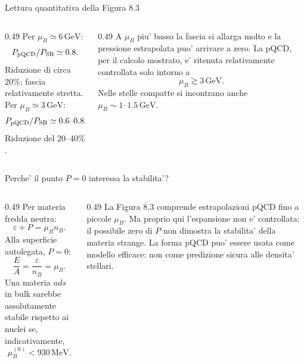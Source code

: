 \begin{frame}{Lettura quantitativa della Figura 8.3}
\small
\begin{columns}[T,onlytextwidth]
\begin{column}{0.49\textwidth}
Per $\mu_B\simeq6\,\mathrm{GeV}$:
\[
P_{\rm pQCD}/P_{\rm SB}\simeq0.8.
\]
Riduzione di circa $20\%$; fascia relativamente stretta.
\medskip
Per $\mu_B\simeq3\,\mathrm{GeV}$:
\[
P_{\rm pQCD}/P_{\rm SB}
\simeq0.6\text{--}0.8.
\]
Riduzione del $20\text{--}40\%$.
\end{column}
\begin{column}{0.49\textwidth}
A $\mu_B$ piu' basso la fascia
si allarga molto e la pressione
estrapolata puo' arrivare a zero.
\medskip
La pQCD, per il calcolo mostrato,
e' ritenuta relativamente controllata
solo intorno a
\[
\mu_B\gtrsim3\,\mathrm{GeV}.
\]
Nelle stelle compatte si incontrano
anche $\mu_B\sim1\text{--}1.5\,\mathrm{GeV}$.
\end{column}
\end{columns}
\end{frame}

\begin{frame}{Perche' il punto $P=0$ interessa la stabilita'?}
\small
\begin{columns}[T,onlytextwidth]
\begin{column}{0.49\textwidth}
Per materia fredda neutra:
\[
\varepsilon+P=\mu_B n_B.
\]
Alla superficie autolegata, $P=0$:
\[
\frac EA=\frac{\varepsilon}{n_B}=\mu_B.
\]
Una materia $uds$ in bulk sarebbe
assolutamente stabile rispetto ai nuclei
se, indicativamente,
\[
\mu_B^{(0)}<930\,\mathrm{MeV}.
\]
\end{column}
\begin{column}{0.49\textwidth}
La Figura 8.3 comprende estrapolazioni
pQCD fino a piccole $\mu_B$.
\medskip
Ma proprio qui l'espansione non e'
controllata: il possibile zero di $P$
non dimostra la stabilita' della materia strange.
\medskip
La forma pQCD puo' essere usata
come modello efficace: non come predizione
sicura alle densita' stellari.
\end{column}
\end{columns}
\end{frame}


